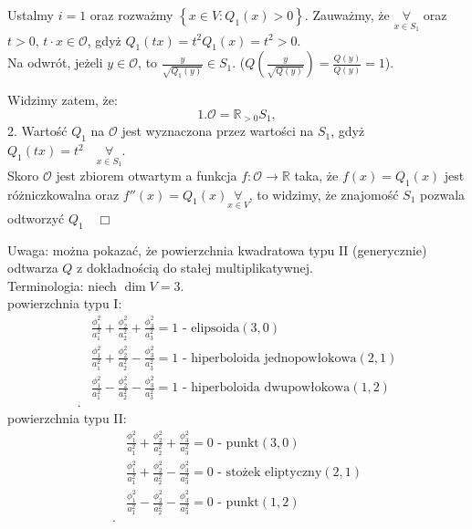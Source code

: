 \documentclass[../main.tex]{subfiles}
\begin{document}
\begin{dowod}
    Ustalmy $i = 1$ oraz rozważmy $\left\{ x\in V: Q_1(x) > 0 \right\} $. Zauważmy, że $\underset{x\in S_1}{\forall}$ oraz $t>0$, $t\cdot x\in \mathcal{O}$, gdyż $Q_1(tx) = t^2Q_1(x) = t^2 >0$.\\
    Na odwrót, jeżeli $y\in \mathcal{O}$, to $\frac{y}{\sqrt{Q_1(y)}}\in S_1$. ($Q(\frac{y}{\sqrt{Q(y)}}) = \frac{Q(y)}{Q(y)} = 1$).

    Widzimy zatem, że:
    \[
    1. \mathcal{O} = \mathbb{R}_{>0}S_1
    ,\]
    2. Wartość $Q_1$ na $\mathcal{O}$ jest wyznaczona przez wartości na  $S_1$, gdyż $Q_1(tx) = t^2\quad \underset{x\in S_1}{\forall} $.\\
    Skoro $\mathcal{O}$ jest zbiorem otwartym a funkcja $f: \mathcal{O}\to \mathbb{R}$ taka, że $f(x) = Q_1(x)$ jest różniczkowalna oraz $f''(x) = Q_1(x) \underset{x\in V}{\forall}$, to widzimy, że znajomość $S_1$ pozwala odtworzyć $Q_1\quad\Box$
\end{dowod}
Uwaga: można pokazać, że powierzchnia kwadratowa typu II (generycznie) odtwarza $Q$ z dokładnością do stałej multiplikatywnej.\\
Terminologia: niech $\dim V = 3$.\\
powierzchnia typu  I:
\begin{align*}
    &\frac{\phi_1^2}{a_1^2}+ \frac{\phi_2^2}{a_2^2}+\frac{\phi_3^2}{a_3^2} = 1 \text{ - elipsoida} (3,0)\\
    &\frac{\phi_1^2}{a_1^2}+ \frac{\phi_2^2}{a_2^2}-\frac{\phi_3^2}{a_3^2} = 1 \text{ - hiperboloida jednopowłokowa} (2,1)\\
    &\frac{\phi_1^2}{a_1^2}- \frac{\phi_2^2}{a_2^2}-\frac{\phi_3^2}{a_3^2} = 1 \text{ - hiperboloida dwupowłokowa} (1,2)\\
.\end{align*}
powierzchnia typu II:
\begin{align*}
    &\frac{\phi_1^2}{a_1^2}+\frac{\phi_2^2}{a_2^2}+\frac{\phi_3^2}{a_3^2} = 0 \text{ - punkt}(3,0)\\
    &\frac{\phi_1^2}{a_1^2}+\frac{\phi_2^2}{a_2^2}-\frac{\phi_3^2}{a_3^2} = 0 \text{ - stożek eliptyczny}(2,1)\\
    &\frac{\phi_1^2}{a_1^2}-\frac{\phi_2^2}{a_2^2}-\frac{\phi_3^2}{a_3^2} = 0 \text{ - punkt}(1,2)\\
.\end{align*}
\end{document}

